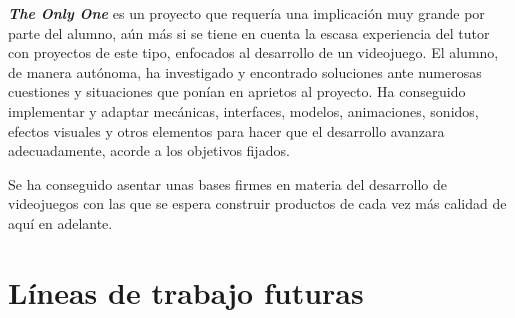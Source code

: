\textbf{\textit{The Only One}} es un proyecto que requería una implicación muy grande por parte del alumno, aún más si se tiene en cuenta la escasa experiencia del tutor con proyectos de este tipo, enfocados al desarrollo de un videojuego. El alumno, de manera autónoma, ha investigado y encontrado soluciones ante numerosas cuestiones y situaciones que ponían en aprietos al proyecto. Ha conseguido implementar y adaptar mecánicas, interfaces, modelos, animaciones, sonidos, efectos visuales y otros elementos para hacer que el desarrollo avanzara adecuadamente, acorde a los objetivos fijados.

Se ha conseguido asentar unas bases firmes en materia del desarrollo de videojuegos con las que se espera construir productos de cada vez más calidad de aquí en adelante.

\section{Líneas de trabajo futuras}

